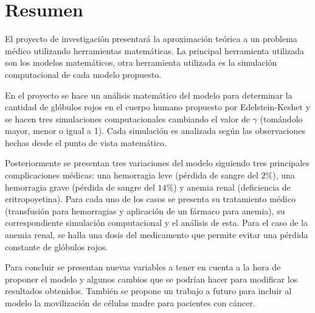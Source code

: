 \chapter*{Resumen}

El proyecto de investigación presentará la aproximación teórica a un problema médico utilizando herramientas matemáticas. La principal herramienta utilizada son los modelos matemáticos, otra herramienta utilizada es la simulación computacional de cada modelo propuesto.

En el proyecto se hace un análisis matemático del modelo para determinar la cantidad de glóbulos rojos en el cuerpo humano propuesto por Edelstein-Keshet y se hacen tres simulaciones computacionales cambiando el valor de $\gamma$ (tomándolo mayor, menor o igual a 1). Cada simulación es analizada según las observaciones hechas desde el punto de vista matemático. 

Posteriormente se presentan tres variaciones del modelo siguiendo tres principales complicaciones médicas: una hemorragia leve (pérdida de sangre del $2\%$), una hemorragia grave (pérdida de sangre del $14\%$) y anemia renal (deficiencia de eritropoyetina). Para cada uno de los casos se presenta su tratamiento médico (transfusión para hemorragias y aplicación de un fármaco para anemia), su correspondiente simulación computacional y el análisis de esta. Para el caso de la anemia renal, se halla una dosis del medicamento que permite evitar una pérdida constante de glóbulos rojos. 

Para concluir se presentan nuevas variables a tener en cuenta a la hora de proponer el modelo y algunos cambios que se podrían hacer para modificar los resultados obtenidos. También se propone un trabajo a futuro para incluir al modelo la movilización de células madre para pacientes con cáncer.


